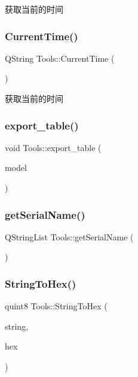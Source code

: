 获取当前的时间 

\mbox{\label{class_tools_af10c90501143838d9af896a60026668d}} 
\subsubsection{\texorpdfstring{CurrentTime()}{CurrentTime()}}
{\footnotesize\ttfamily Q\+String Tools\+::\+Current\+Time (\begin{DoxyParamCaption}{ }\end{DoxyParamCaption})}



获取当前的时间 

\mbox{\label{class_tools_af6c4eaadfb21ee231cbc4d6384250629}} 
\subsubsection{\texorpdfstring{export\_table()}{export\_table()}}
{\footnotesize\ttfamily void Tools\+::export\+\_\+table (\begin{DoxyParamCaption}\item[{const Q\+Abstract\+Item\+Model \&}]{model }\end{DoxyParamCaption})}

\mbox{\label{class_tools_ac18eb440bd7a33e8e242df2cc4d4d4bc}} 
\subsubsection{\texorpdfstring{getSerialName()}{getSerialName()}}
{\footnotesize\ttfamily Q\+String\+List Tools\+::get\+Serial\+Name (\begin{DoxyParamCaption}{ }\end{DoxyParamCaption})}

\mbox{\label{class_tools_a724c823ede8cd11880888f64b1a3c4df}} 
\subsubsection{\texorpdfstring{StringToHex()}{StringToHex()}}
{\footnotesize\ttfamily quint8 Tools\+::\+String\+To\+Hex (\begin{DoxyParamCaption}\item[{Q\+String}]{string,  }\item[{quint8 $\ast$}]{hex }\end{DoxyParamCaption})}



